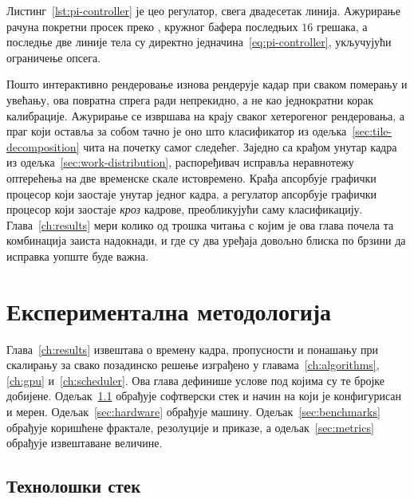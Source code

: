 \documentclass[serbian]{ftndiplomski}
\begin{document}
Листинг~\ref{lst:pi-controller} је цео регулатор, свега двадесетак линија.
Ажурирање  рачуна покретни просек преко , кружног
бафера последњих $16$ грешака, а последње две линије тела  су директно
једначина~\ref{eq:pi-controller}, укључујући ограничење опсега.

\noindent\begin{minipage}{\linewidth}

\end{minipage}

Пошто интерактивно рендеровање изнова рендерује кадар при сваком померању и увећању,
ова повратна спрега ради непрекидно, а не као једнократни корак калибрације.
Ажурирање се извршава на крају сваког хетерогеног рендеровања, а праг који оставља за
собом тачно је оно што класификатор из одељка~\ref{sec:tile-decomposition} чита на
почетку самог следећег. Заједно са крађом унутар кадра из
одељка~\ref{sec:work-distribution}, распоређивач исправља неравнотежу оптерећења на
две временске скале истовремено. Крађа апсорбује графички процесор који заостаје
унутар једног кадра, а регулатор апсорбује графички процесор који заостаје
\emph{кроз} кадрове, преобликујући саму класификацију. Глава~\ref{ch:results} мери
колико од трошка читања с којим је ова глава почела та комбинација заиста надокнади,
и где су два уређаја довољно блиска по брзини да исправка уопште буде важна.

\chapter{Експериментална методологија}
\label{ch:methodology}

Глава~\ref{ch:results} извештава о времену кадра, пропусности и понашању при
скалирању за свако позадинско решење изграђено у главама~\ref{ch:algorithms},
\ref{ch:gpu} и~\ref{ch:scheduler}. Ова глава дефинише услове под којима су те бројке
добијене. Одељак~\ref{sec:technology-stack} обрађује софтверски стек и начин на који
је конфигурисан и мерен. Одељак~\ref{sec:hardware} обрађује машину.
Одељак~\ref{sec:benchmarks} обрађује коришћене фрактале, резолуције и приказе, а
одељак~\ref{sec:metrics} обрађује извештаване величине.

\section{Технолошки стек}
\label{sec:technology-stack}
\end{document}
